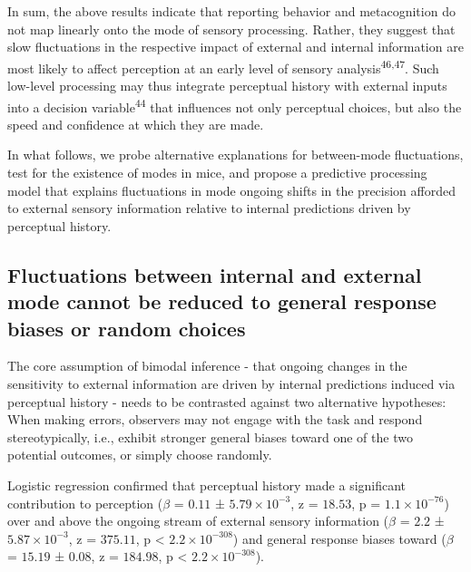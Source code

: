 \documentclass[
]{article}
\begin{document}
In sum, the above results indicate that reporting behavior and
metacognition do not map linearly onto the mode of sensory processing.
Rather, they suggest that slow fluctuations in the respective impact of
external and internal information are most likely to affect perception
at an early level of sensory analysis\textsuperscript{46,47}. Such
low-level processing may thus integrate perceptual history with external
inputs into a decision variable\textsuperscript{44} that influences not
only perceptual choices, but also the speed and confidence at which they
are made.

In what follows, we probe alternative explanations for between-mode
fluctuations, test for the existence of modes in mice, and propose a
predictive processing model that explains fluctuations in mode ongoing
shifts in the precision afforded to external sensory information
relative to internal predictions driven by perceptual history.

\hypertarget{fluctuations-between-internal-and-external-mode-cannot-be-reduced-to-general-response-biases-or-random-choices}{%
\subsection{Fluctuations between internal and external mode cannot be
reduced to general response biases or random
choices}\label{fluctuations-between-internal-and-external-mode-cannot-be-reduced-to-general-response-biases-or-random-choices}}

The core assumption of bimodal inference - that ongoing changes in the
sensitivity to external information are driven by internal predictions
induced via perceptual history - needs to be contrasted against two
alternative hypotheses: When making errors, observers may not engage
with the task and respond stereotypically, i.e., exhibit stronger
general biases toward one of the two potential outcomes, or simply
choose randomly.

Logistic regression confirmed that perceptual history made a significant
contribution to perception (\(\beta\) = \(0.11\) ±
\(\ensuremath{5.79\times 10^{-3}}\), z = \(18.53\), p =
\(\ensuremath{1.1\times 10^{-76}}\)) over and above the ongoing stream
of external sensory information (\(\beta\) = \(2.2\) ±
\(\ensuremath{5.87\times 10^{-3}}\), z = \(375.11\), p < \(\ensuremath{2.2\times 10^{-308}}\)) and
general response biases toward (\(\beta\) = \(15.19\) ± \(0.08\), z =
\(184.98\), p < \(\ensuremath{2.2\times 10^{-308}}\)).
\end{document}
